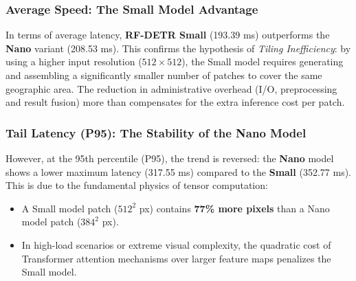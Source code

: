 \subsubsection{Average Speed: The Small Model Advantage}

In terms of average latency, \textbf{RF-DETR Small} (193.39 ms) outperforms the \textbf{Nano} variant (208.53 ms). This confirms the hypothesis of \textit{Tiling Inefficiency}: by using a higher input resolution ($512 \times 512$), the Small model requires generating and assembling a significantly smaller number of patches to cover the same geographic area. The reduction in administrative overhead (I/O, preprocessing and result fusion) more than compensates for the extra inference cost per patch.

\subsubsection{Tail Latency (P95): The Stability of the Nano Model}

However, at the 95th percentile (P95), the trend is reversed: the \textbf{Nano} model shows a lower maximum latency (317.55 ms) compared to the \textbf{Small} (352.77 ms). This is due to the fundamental physics of tensor computation:

\begin{itemize}
    \item A Small model patch ($512^2$ px) contains \textbf{77\% more pixels} than a Nano model patch ($384^2$ px).
    \item In high-load scenarios or extreme visual complexity, the quadratic cost of Transformer attention mechanisms over larger feature maps penalizes the Small model.
\end{itemize}

